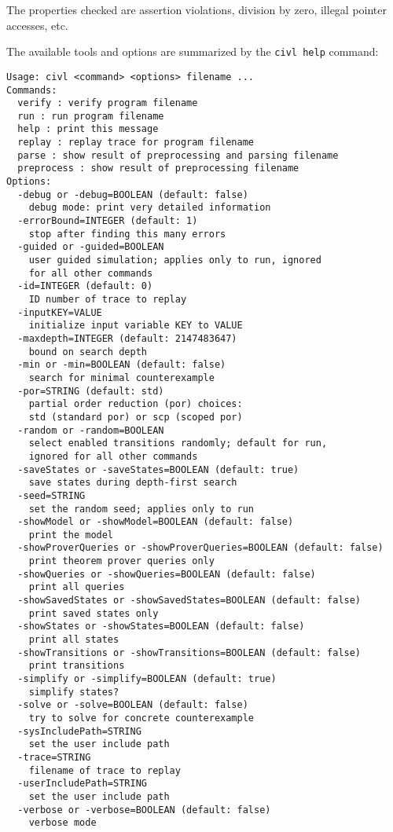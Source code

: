 \documentclass[11pt]{book}
\begin{document}
The properties checked are assertion violations, division by zero,
illegal pointer accesses, etc.

The available tools and options are summarized by the \texttt{civl
  help} command:

\begin{verbatim}
Usage: civl <command> <options> filename ...
Commands:
  verify : verify program filename
  run : run program filename
  help : print this message
  replay : replay trace for program filename
  parse : show result of preprocessing and parsing filename
  preprocess : show result of preprocessing filename
Options:
  -debug or -debug=BOOLEAN (default: false)
    debug mode: print very detailed information
  -errorBound=INTEGER (default: 1)
    stop after finding this many errors
  -guided or -guided=BOOLEAN
    user guided simulation; applies only to run, ignored
    for all other commands
  -id=INTEGER (default: 0)
    ID number of trace to replay
  -inputKEY=VALUE
    initialize input variable KEY to VALUE
  -maxdepth=INTEGER (default: 2147483647)
    bound on search depth
  -min or -min=BOOLEAN (default: false)
    search for minimal counterexample
  -por=STRING (default: std)
    partial order reduction (por) choices:
    std (standard por) or scp (scoped por)
  -random or -random=BOOLEAN
    select enabled transitions randomly; default for run,
    ignored for all other commands
  -saveStates or -saveStates=BOOLEAN (default: true)
    save states during depth-first search
  -seed=STRING
    set the random seed; applies only to run
  -showModel or -showModel=BOOLEAN (default: false)
    print the model
  -showProverQueries or -showProverQueries=BOOLEAN (default: false)
    print theorem prover queries only
  -showQueries or -showQueries=BOOLEAN (default: false)
    print all queries
  -showSavedStates or -showSavedStates=BOOLEAN (default: false)
    print saved states only
  -showStates or -showStates=BOOLEAN (default: false)
    print all states
  -showTransitions or -showTransitions=BOOLEAN (default: false)
    print transitions
  -simplify or -simplify=BOOLEAN (default: true)
    simplify states?
  -solve or -solve=BOOLEAN (default: false)
    try to solve for concrete counterexample
  -sysIncludePath=STRING
    set the user include path
  -trace=STRING
    filename of trace to replay
  -userIncludePath=STRING
    set the user include path
  -verbose or -verbose=BOOLEAN (default: false)
    verbose mode
\end{verbatim}
\end{document}
